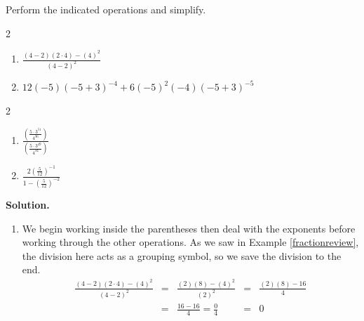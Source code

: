 \documentclass{ximera}
\begin{document}
\smallskip

\begin{example} \label{exponentreview}  Perform the indicated operations and simplify.

\begin{multicols}{2}

\begin{enumerate}

\item  $\frac{(4-2)(2 \cdot 4)-(4)^2}{(4-2)^2}$

\item $12(-5)(-5+3)^{-4}+6(-5)^2(-4)(-5+3)^{-5}$

\setcounter{HW}{\value{enumi}}

\end{enumerate}

\end{multicols}

\begin{multicols}{2}

\begin{enumerate}

\setcounter{enumi}{\value{HW}}

\item  $\frac{\left(\frac{5\cdot 3^{51}}{4^{36}}\right)}{\left(\frac{5 \cdot 3^{49}}{4^{34}}\right)}$

\item $\frac{2 \left(\frac{5}{12}\right)^{-1}}{1 - \left(\frac{5}{12}\right)^{-2}}$

\end{enumerate}

\end{multicols}


{\bf Solution.}

\begin{enumerate}

\item  We begin working inside the parentheses then deal with the exponents before working through the other operations.  As we saw in Example \ref{fractionreview}, the division here acts as a grouping symbol, so we save the division to the end.\[ \begin{array}{rclcl}

\frac{(4-2)(2 \cdot 4)-(4)^2}{(4-2)^2} & = & \frac{(2)(8)-(4)^2}{(2)^2} & = & \frac{(2)(8)-16}{4} \\  
                                        & = & \frac{16-16}{4} = \frac{0}{4} & = & 0 \\ \end{array}\]


\end{enumerate}
\end{example}
\end{document}
